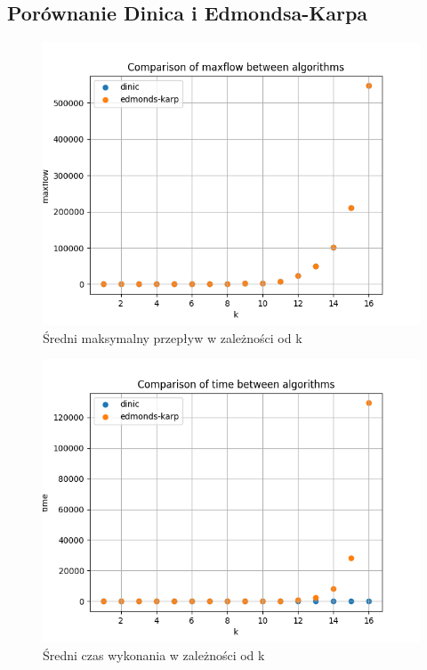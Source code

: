 \documentclass{report}
\begin{document}
\subsection*{Porównanie Dinica i Edmondsa-Karpa}
\begin{figure}[H]
    \centering
    \includegraphics[scale=0.55]{../ex1_and_4/plots/karp_vs_dinic_maxflow.png}
    \caption{Średni maksymalny przepływ w zależności od k}
\end{figure}
\begin{figure}[H]
    \centering
    \includegraphics[scale=0.55]{../ex1_and_4/plots/karp_vs_dinic_time.png}
    \caption{Średni czas wykonania w zależności od k}
\end{figure}
\end{document}
